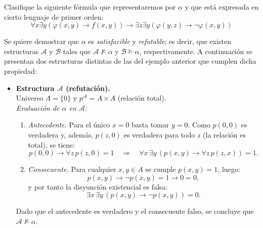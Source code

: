 \documentclass[12pt]{article}
\begin{document}
\begin{ejercicio}
    Clasifique la siguiente fórmula que representaremos por $\alpha$ y que está expresada en cierto lenguaje de primer orden:
    \[
        \forall x \exists y (\varphi(x,y) \rightarrow f(x,y)) \rightarrow \exists z \exists y (\varphi(y,z) \rightarrow \neg \varphi(x,y))
    \]


    Se quiere demostrar que $\alpha$ es \emph{satisfacible} y \emph{refutable}; es decir, que existen estructuras $\mathcal{A}$ y $\mathcal{B}$ tales que 
$\mathcal{A} \not\models \alpha$ y $\mathcal{B} \models \alpha$, respectivamente.
A continuación se presentan dos estructuras distintas de las del ejemplo anterior que cumplen dicha propiedad:

\begin{itemize}
    \item \textbf{Estructura $\mathcal{A}$ (refutación).}\\
    Universo $A = \{0\}$ y $p^{\mathcal{A}} = A \times A$ (relación total).\\[2mm]
    \emph{Evaluación de $\alpha$ en $\mathcal{A}$:}
    \begin{enumerate}
        \item \emph{Antecedente.} Para el único $x = 0$ basta tomar $y = 0$. Como $p(0,0)$ es verdadera y, además, $p(z,0)$ es verdadera para todo $z$ (la relación es total), se tiene:
        \[
        p(0,0) \rightarrow \forall z\, p(z,0) = 1 \quad \Rightarrow \quad \forall x\,\exists y\,(p(x,y)\rightarrow\forall z\,p(z,x)) = 1.
        \]
        \item \emph{Consecuente.} Para cualquier $x,y \in A$ se cumple $p(x,y) = 1$, luego:
        \[
        p(x,y)\rightarrow\neg p(x,y) = 1\rightarrow 0 = 0,
        \]
        y por tanto la disyunción existencial es falsa:
        \[
        \exists x\,\exists y\,(p(x,y)\rightarrow\neg p(x,y)) = 0.
        \]
    \end{enumerate}
    Dado que el antecedente es verdadero y el consecuente falso, se concluye que \emph{$\mathcal{A} \not\models \alpha$}.


\end{itemize}
\end{ejercicio}
\end{document}
